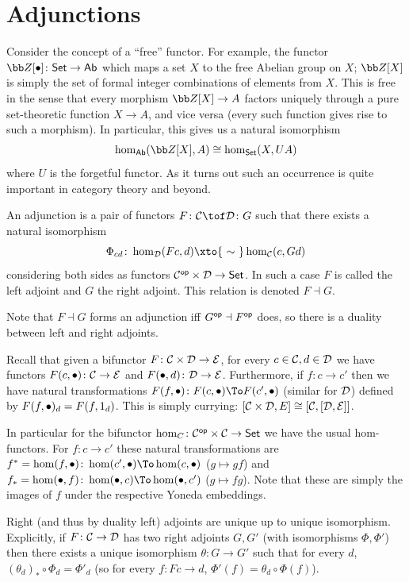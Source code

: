 \section{Adjunctions}

Consider the concept of a ``free'' functor.
For example, the functor $\bZ[\bul]\colon\Set\to\ab$ which maps a set $X$ to the free Abelian group on $X$; $\bZ[X]$ is simply the set of formal integer combinations of elements from $X$.
This is free in the sense that every morphism $\bZ[X]\to A$ factors uniquely through a pure set-theoretic function $X\to A$, and vice versa (every such function gives rise to such a morphism).
In particular, this gives us a natural isomorphism
$$ \hom_\ab(\bZ[X],A) \cong \hom_\Set(X,UA) $$
where $U$ is the forgetful functor.
As it turns out such an occurrence is quite important in category theory and beyond.

\bdefn

    An {\emphcolor adjunction} is a pair of functors $F\colon\C\tof\D\colon G$ such that there exists a natural isomorphism
    $$ \Phi_{cd}\colon\hom_\D(Fc,d) \xto{\ \sim\ }\hom_\C(c,Gd) $$
    considering both sides as functors ${{\cal C}}^{\sf op}\times{{\cal D}}\to{\sf Set}$.
    In such a case $F$ is called the {\emphcolor left adjoint} and $G$ the {\emphcolor right adjoint}.
    This relation is denoted $F\dashv G$.

\edefn

Note that $F\dashv G$ forms an adjunction iff $G^{\sf op}\dashv F^{\sf op}$ does, so there is a duality between left and right adjoints.

Recall that given a bifunctor $F\colon{{\cal C}}\times{{\cal D}}\to{{\cal E}}$, for every $c\in{{\cal C}},d\in{{\cal D}}$ we have functors $F(c,\bullet)\colon{{\cal C}}\to{{\cal E}}$ and $F(\bullet,d)\colon{{\cal D}}\to{{\cal E}}$.
Furthermore, if $f\colon c\to c'$ then we have natural transformations $F(f,\bul)\colon F(c,\bul)\To F(c',\bul)$ (similar for ${{\cal D}}$) defined by $F(f,\bullet)_d=F(f,1_d)$.
This is simply currying: $[{{\cal C}}\times{{\cal D}},E]\cong[{{\cal C}},[{{\cal D}},{{\cal E}}]]$.

In particular for the bifunctor $\hom_C\colon{{\cal C}}^{\sf op}\times{{\cal C}}\to{\sf Set}$ we have the usual hom-functors.
For $f\colon c\to c'$ these natural transformations are $f^*=\hom(f,\bul)\colon\hom(c',\bul)\To\hom(c,\bul)$ ($g\mapsto gf$) and $f_*=\hom(\bul,f)\colon\hom(\bul,c)\To\hom(\bul,c')$ ($g\mapsto fg$).
Note that these are simply the images of $f$ under the respective Yoneda embeddings.

\bthrm

    Right (and thus by duality left) adjoints are unique up to unique isomorphism.
    Explicitly, if $F\colon{{\cal C}}\to{{\cal D}}$ has two right adjoints $G,G'$ (with isomorphisms $\Phi,\Phi'$) then there exists a unique isomorphism $\theta\colon G\to G'$
    such that for every $d$, $(\theta_d)_*\circ\Phi_d=\Phi'_d$ (so for every $f\colon Fc\to d$, $\Phi'(f)=\theta_d\circ\Phi(f)$).

